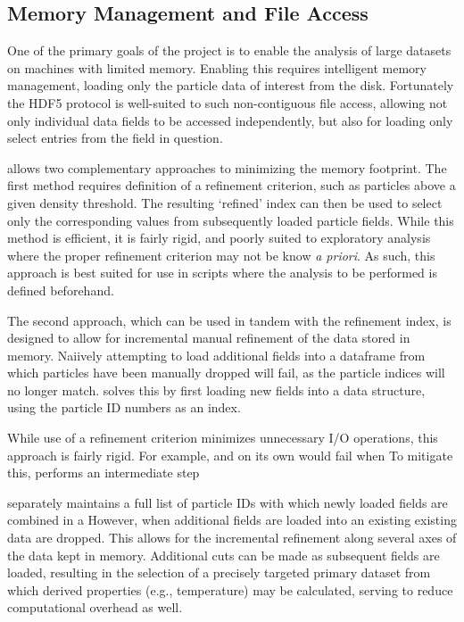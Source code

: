 \subsection{Memory Management and File Access}
\label{sec:fileIO}
One of the primary goals of the  project is to enable the analysis of large datasets on machines with limited memory.
Enabling this requires intelligent memory management, loading only the particle data of interest from the disk.
Fortunately the HDF5 protocol is well-suited to such non-contiguous file access, allowing not only individual data fields to be accessed independently, but also for  loading only select entries from the field in question.

 allows two complementary approaches to minimizing the memory footprint.
The first method requires definition of a refinement criterion, such as particles above a given density threshold.
The resulting `refined' index can then be used to select only the corresponding values from subsequently loaded particle fields.
While this method is efficient, it is fairly rigid, and poorly suited to exploratory analysis where the proper refinement criterion may not be know {\it{a priori}}.  As such, this approach is best suited for use in scripts where the analysis to be performed is defined beforehand.

The second approach, which can be used in tandem with the refinement index, is designed to allow for incremental manual refinement of the data stored in memory. 
Naiively attempting to load additional fields into a dataframe from which particles have been manually dropped will fail, as the particle indices will no longer match.  solves this by first loading new fields into a  data structure, using the particle ID numbers as an index.  

While use of a refinement criterion minimizes unnecessary I/O operations, this approach is fairly rigid.  For example,  and on its own would fail when 
To mitigate this,  performs an intermediate step

separately maintains a full list of particle IDs with which newly loaded fields are combined in a 
However, when additional fields are loaded into an existing  existing data are dropped.
This allows for the incremental refinement along several axes of the data kept in memory.
Additional cuts can be made as subsequent fields are loaded, resulting in the selection of a precisely targeted primary dataset from which derived properties (e.g., temperature) may be calculated, serving to reduce computational overhead as well.